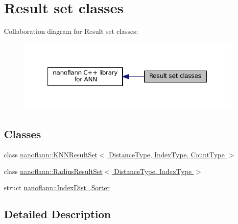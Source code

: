 \hypertarget{group__result__sets__grp}{\section{Result set classes}
\label{group__result__sets__grp}
}
Collaboration diagram for Result set classes\-:\nopagebreak
\begin{figure}[H]
\begin{center}
\leavevmode
\includegraphics[width=340pt]{group__result__sets__grp}
\end{center}
\end{figure}
\subsection*{Classes}
\begin{DoxyCompactItemize}
\item 
class \hyperlink{classnanoflann_1_1_k_n_n_result_set}{nanoflann\-::\-K\-N\-N\-Result\-Set$<$ Distance\-Type, Index\-Type, Count\-Type $>$}
\item 
class \hyperlink{classnanoflann_1_1_radius_result_set}{nanoflann\-::\-Radius\-Result\-Set$<$ Distance\-Type, Index\-Type $>$}
\item 
struct \hyperlink{structnanoflann_1_1_index_dist___sorter}{nanoflann\-::\-Index\-Dist\-\_\-\-Sorter}
\end{DoxyCompactItemize}


\subsection{Detailed Description}
